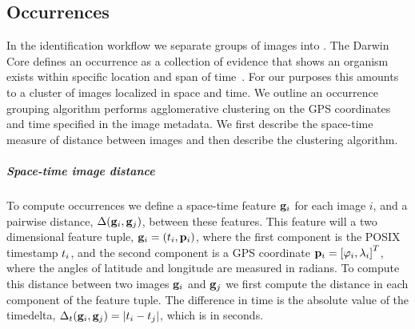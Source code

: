 \begin{appendices}

\chapter{Occurrences}\label{app:occurgroup}

    In the identification workflow we separate groups of images into .
    The Darwin Core defines an occurrence as a collection of evidence that shows an organism exists within
      specific location and span of time~\cite{wieczorek_darwin_2012}.
    For our purposes this amounts to a cluster of images localized in space and time.
    We outline an occurrence grouping algorithm performs agglomerative clustering on the GPS coordinates and time
      specified in the image metadata.
    We first describe the space-time measure of distance between images and then describe the clustering
      algorithm.

    \paragraph{Space-time image distance}
    To compute occurrences we define a space-time feature $\mathbf{g}_i$ for each image $i$, and a pairwise distance,
      $\Delta(\mathbf{g}_i, \mathbf{g}_j)$, between these features.
    This feature will a two dimensional feature tuple, %
    $\mathbf{g}_i = \left(t_i, \mathbf{p}_i\right)$, where the first component is the POSIX timestamp $t_i$, and the second
      component is a GPS coordinate %
    $\mathbf{p}_i = \left[\varphi_i, \lambda_i\right]^{T}$, where the angles of latitude and longitude are measured in radians.
    To compute this distance between two images $\mathbf{g}_i$ and $\mathbf{g}_j$ we first compute the distance in each component
      of the feature tuple.
    The difference in time is the absolute value of the timedelta,  %
    $\Delta_t(\mathbf{g}_i, \mathbf{g}_j) = |t_i - t_j|$, which is in seconds.


\end{appendices}
